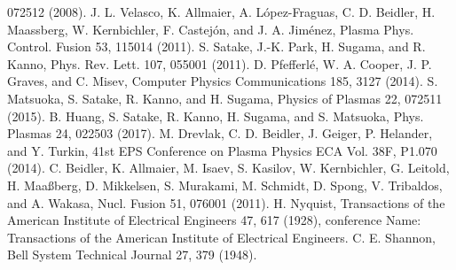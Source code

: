 \documentclass[./main.tex]{subfiles}
\begin{document}
\begin{thebibliography}{1}
072512 (2008).
	J. L. Velasco, K. Allmaier, A. L\'opez-Fraguas, C. D. Beidler, H. Maassberg, W. Kernbichler,
F. Castej\'on, and J. A. Jim\'enez, Plasma Phys. Control. Fusion 53, 115014 (2011).
	S. Satake, J.-K. Park, H. Sugama, and R. Kanno, Phys. Rev. Lett. 107, 055001 (2011).
	D. Pfefferl\'e, W. A. Cooper, J. P. Graves, and C. Misev, Computer Physics Communications
185, 3127 (2014).
	S. Matsuoka, S. Satake, R. Kanno, and H. Sugama, Physics of Plasmas 22, 072511 (2015).
	 B. Huang, S. Satake, R. Kanno, H. Sugama, and S. Matsuoka, Phys. Plasmas 24, 022503
(2017).
	 M. Drevlak, C. D. Beidler, J. Geiger, P. Helander, and Y. Turkin, 41st EPS Conference
on Plasma Physics ECA Vol. 38F, P1.070 (2014).
	C. Beidler, K. Allmaier, M. Isaev, S. Kasilov, W. Kernbichler, G. Leitold, H. Maa\ss berg,
D. Mikkelsen, S. Murakami, M. Schmidt, D. Spong, V. Tribaldos, and A. Wakasa, Nucl.
Fusion 51, 076001 (2011).
	H. Nyquist, Transactions of the American Institute of Electrical Engineers 47, 617 (1928),
conference Name: Transactions of the American Institute of Electrical Engineers.
	C. E. Shannon, Bell System Technical Journal 27, 379 (1948).

\end{thebibliography}
\end{document}
